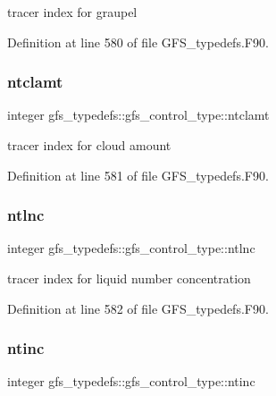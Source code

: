 tracer index for graupel 



Definition at line 580 of file G\+F\+S\+\_\+typedefs.\+F90.

\mbox{\label{structgfs__typedefs_1_1gfs__control__type_a298a7648e92ed65f788b5308a2ed2486}} 
\subsubsection{ntclamt}
{\footnotesize\ttfamily integer gfs\+\_\+typedefs\+::gfs\+\_\+control\+\_\+type\+::ntclamt}



tracer index for cloud amount 



Definition at line 581 of file G\+F\+S\+\_\+typedefs.\+F90.

\mbox{\label{structgfs__typedefs_1_1gfs__control__type_aa763e6eaaf55e6a6df31dbb80a9b7bbc}} 
\subsubsection{ntlnc}
{\footnotesize\ttfamily integer gfs\+\_\+typedefs\+::gfs\+\_\+control\+\_\+type\+::ntlnc}



tracer index for liquid number concentration 



Definition at line 582 of file G\+F\+S\+\_\+typedefs.\+F90.

\mbox{\label{structgfs__typedefs_1_1gfs__control__type_a16ba5f8bae7f3adfb5af2333177a2ebf}} 
\subsubsection{ntinc}
{\footnotesize\ttfamily integer gfs\+\_\+typedefs\+::gfs\+\_\+control\+\_\+type\+::ntinc}



